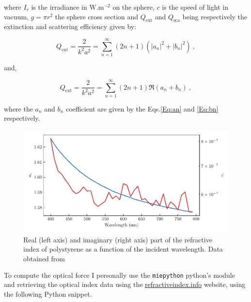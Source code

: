 where $I_r$ is the irradiance in $\mathrm{W.m^{-2}}$ on the sphere,  $c$ is the speed of light in vacuum, $g=\pi r^2$ the sphere cross section and  $Q_\mathrm{ext}$ and $Q_\mathrm{sca}$ being respectively the extinction and scattering efficiency given by:

\begin{equation}
	Q_\mathrm{ext} = \frac{2}{k^2 a^2} = \sum _{n=1} ^\infty (2n + 1 ) (|a_n|^2 + |b_n|^2) ~,
\end{equation}

and,

\begin{equation}
	Q_\mathrm{ext} = \frac{2}{k^2 a^2} = \sum _{n=1} ^\infty (2n + 1 ) \Re (a_n + b_n) ~,
\end{equation}

where the $a_n$ and $b_n$ coefficient are given by the Eqs.\ref{Eq:an} and \ref{Eq:bn} respectively.


\begin{figure}[H]
	\centering
	\includegraphics[scale=0.9]{02_body/chapter2/images/Calcul_force_optique/refractive_index.pdf}
	\caption{Real (left axis) and imaginary (right axis) part of the refractive index of polystyrene as a function of the incident wavelength. Data obtained from \cite{zhang_complex_2020}}
	\label{fig:refractive_index}
\end{figure}

To compute the optical force I personally use the \texttt{miepython} python's module \href{https://github.com/scottprahl/miepython/}{\faGithub} and retrieving the optical index data using the \href{https://refractiveindex.info/?shelf=organic&book=polystyren&page=Zhang}{refractiveindex.info} website, using the following Python snippet.

